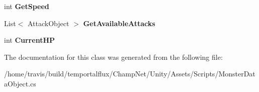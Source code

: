\begin{DoxyCompactItemize}
\item 
\hypertarget{class_monster_data_object_a0d7639dc92ae01942b1b996565eff2ae}{int {\bfseries Get\-Speed}}\label{class_monster_data_object_a0d7639dc92ae01942b1b996565eff2ae}

\item 
\hypertarget{class_monster_data_object_aced78f5f04d3dbb79a0f8291fbe118bd}{List$<$ Attack\-Object $>$ {\bfseries Get\-Available\-Attacks}}\label{class_monster_data_object_aced78f5f04d3dbb79a0f8291fbe118bd}

\item 
\hypertarget{class_monster_data_object_a3fb8d9a68f08c27657016a72c94faad2}{int {\bfseries Current\-H\-P}}\label{class_monster_data_object_a3fb8d9a68f08c27657016a72c94faad2}

\end{DoxyCompactItemize}


The documentation for this class was generated from the following file\-:\begin{DoxyCompactItemize}
\item 
/home/travis/build/temportalflux/\-Champ\-Net/\-Unity/\-Assets/\-Scripts/Monster\-Data\-Object.\-cs\end{DoxyCompactItemize}
